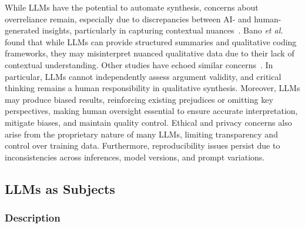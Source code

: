 While LLMs have the potential to automate synthesis, concerns about overreliance remain, especially due to discrepancies between AI- and human-generated insights, particularly in capturing contextual nuances~\cite{bano2023exploringqualitativeresearchusing}.
Bano \textit{et al.}~\cite{bano2023exploringqualitativeresearchusing} found that while LLMs can provide structured summaries and qualitative coding frameworks, they may misinterpret nuanced qualitative data due to their lack of contextual understanding. Other studies have echoed similar concerns~\cite{DBLP:journals/ase/BanoHZT24, barros2024largelanguagemodelqualitative, leça2024applicationsimplicationslargelanguage}. In particular, LLMs cannot independently assess argument validity, and critical thinking remains a human responsibility in qualitative synthesis. Moreover, LLMs may produce biased results, reinforcing existing prejudices or omitting key perspectives, making human oversight essential to ensure accurate interpretation, mitigate biases, and maintain quality control. Ethical and privacy concerns also arise from the proprietary nature of many LLMs, limiting transparency and control over training data. Furthermore, reproducibility issues persist due to inconsistencies across inferences, model versions, and prompt variations.



\subsection{LLMs as Subjects}

\subsubsection{Description}

